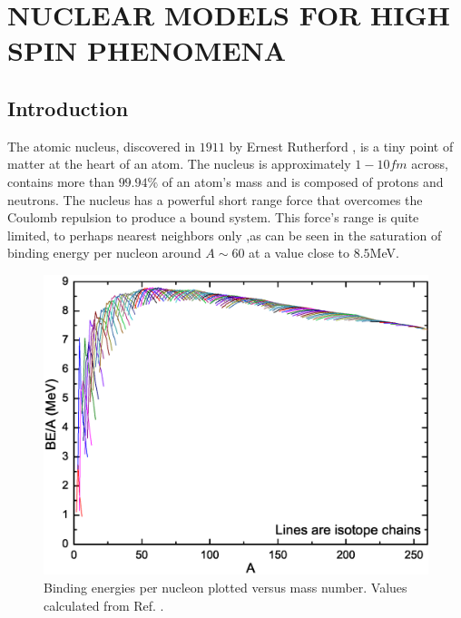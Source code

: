 %
%

\chapter{NUCLEAR MODELS FOR HIGH SPIN PHENOMENA}
\label{chp:models}

\section{Introduction}
\label{sec:models-into}
The atomic nucleus, discovered in $1911$ by Ernest Rutherford \cite{rutherfordNuclearModel}, is a tiny point of matter at the heart of an atom. The nucleus is approximately $1-10fm$ across, contains more than $99.94\%$ of an atom's mass and is composed of protons and neutrons. The nucleus has a powerful short range force that overcomes the Coulomb repulsion to produce a bound system. This force's range is quite limited, to perhaps nearest neighbors only ,as can be seen in the saturation of binding energy per nucleon around $A\sim60$ at a value close to $8.5$MeV.

\begin{figure}[h!]
\centerline{\includegraphics[width=\textwidth]{./img/c2/binding_plot.eps}}
	\caption{Binding energies per nucleon plotted versus mass number. Values calculated from Ref. \cite{AME20031,AME20032}.\label{fig:chp2-binding}}
\end{figure}

